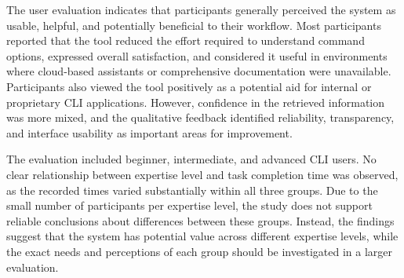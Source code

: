 The user evaluation indicates that participants generally perceived the system as usable, helpful, and potentially beneficial to their workflow. Most participants reported that the tool reduced the effort required to understand command options, expressed overall satisfaction, and considered it useful in environments where cloud-based assistants or comprehensive documentation were unavailable. Participants also viewed the tool positively as a potential aid for internal or proprietary CLI applications. However, confidence in the retrieved information was more mixed, and the qualitative feedback identified reliability, transparency, and interface usability as important areas for improvement.

The evaluation included beginner, intermediate, and advanced CLI users. No clear relationship between expertise level and task completion time was observed, as the recorded times varied substantially within all three groups. Due to the small number of participants per expertise level, the study does not support reliable conclusions about differences between these groups. Instead, the findings suggest that the system has potential value across different expertise levels, while the exact needs and perceptions of each group should be investigated in a larger evaluation.